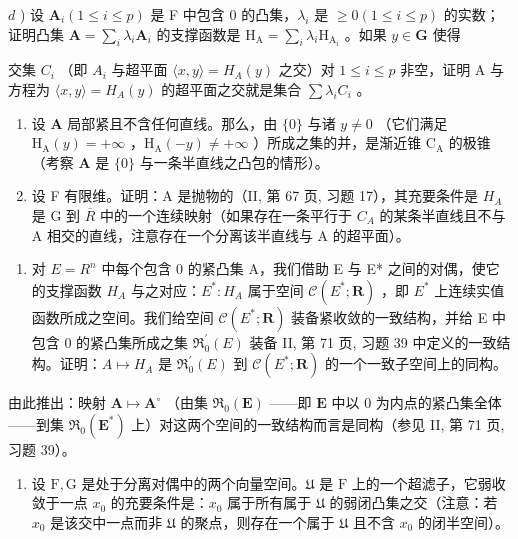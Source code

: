 \(d\) ) 设 \(\mathbf{A}_i(1\leqslant i\leqslant p)\) 是 F 中包含 0 的凸集，\(\lambda_{i}\) 是 \(\geqslant 0(1\leqslant i\leqslant p)\) 的实数；证明凸集 \(\mathbf{A} = \sum_{i}\lambda_{i}\mathbf{A}_{i}\) 的支撑函数是 \(\mathrm{H}_{\mathrm{A}} = \sum_{i}\lambda_{i}\mathrm{H}_{\mathrm{A}_{i}}\) 。如果 \(y\in \mathbf{G}\) 使得

交集 \(C_{i}\) （即 \(A_{i}\) 与超平面 \(\langle x, y \rangle = H_{A}(y)\) 之交）对 \(1 \leqslant i \leqslant p\) 非空，证明 A 与方程为 \(\langle x, y \rangle = H_{A}(y)\) 的超平面之交就是集合 \(\sum \lambda_{i}C_{i}\) 。

\begin{enumerate}
\def\labelenumi{\alph{enumi})}
\setcounter{enumi}{4}
\item
  设 \(\mathbf{A}\) 局部紧且不含任何直线。那么，由 \(\{0\}\) 与诸 \(y \neq 0\) （它们满足 \(\mathrm{H}_{\mathrm{A}}(y) = +\infty\) ，\(\mathrm{H}_{\mathrm{A}}(-y) \neq +\infty\) ）所成之集的并，是渐近锥 \(\mathrm{C}_{\mathrm{A}}\) 的极锥（考察 \(\mathbf{A}\) 是 \(\{0\}\) 与一条半直线之凸包的情形）。
\item
  设 F 有限维。证明：A 是抛物的（II, 第 67 页, 习题 17），其充要条件是 \(H_{A}\) 是 G 到 \(\overline{R}\) 中的一个连续映射（如果存在一条平行于 \(C_{A}\) 的某条半直线且不与 A 相交的直线，注意存在一个分离该半直线与 A 的超平面）。
\end{enumerate}

\begin{enumerate}
\def\labelenumi{\arabic{enumi})}
\setcounter{enumi}{9}
\tightlist
\item
  对 \(E = R^{n}\) 中每个包含 0 的紧凸集 A，我们借助 E 与 E* 之间的对偶，使它的支撑函数 \(H_{A}\) 与之对应：\(E^{*} : H_{A}\) 属于空间 \(\mathcal{C}(E^{*}; \mathbf{R})\) ，即 \(E^{*}\) 上连续实值函数所成之空间。我们给空间 \(\mathcal{C}(E^{*}; \mathbf{R})\) 装备紧收敛的一致结构，并给 E 中包含 0 的紧凸集所成之集 \(\Re_{0}^{\prime}(E)\) 装备 II, 第 71 页, 习题 39 中定义的一致结构。证明：\(A \mapsto H_{A}\) 是 \(\Re_{0}^{\prime}(E)\) 到 \(\mathcal{C}(E^{*}; \mathbf{R})\) 的一个一致子空间上的同构。
\end{enumerate}

由此推出：映射 \(\mathbf{A} \mapsto \mathbf{A}^{\circ}\) （由集 \(\Re_0(\mathbf{E})\) ——即 \(\mathbf{E}\) 中以 0 为内点的紧凸集全体——到集 \(\Re_0(\mathbf{E}^*)\) 上）对这两个空间的一致结构而言是同构（参见 II, 第 71 页, 习题 39）。

\begin{enumerate}
\def\labelenumi{\arabic{enumi})}
\setcounter{enumi}{10}
\tightlist
\item
  设 \(\mathrm{F}, \mathrm{G}\) 是处于分离对偶中的两个向量空间。\(\mathfrak{U}\) 是 \(\mathrm{F}\) 上的一个超滤子，它弱收敛于一点 \(x_0\) 的充要条件是：\(x_0\) 属于所有属于 \(\mathfrak{U}\) 的弱闭凸集之交（注意：若 \(x_0\) 是该交中一点而非 \(\mathfrak{U}\) 的聚点，则存在一个属于 \(\mathfrak{U}\) 且不含 \(x_0\) 的闭半空间）。
\end{enumerate}

